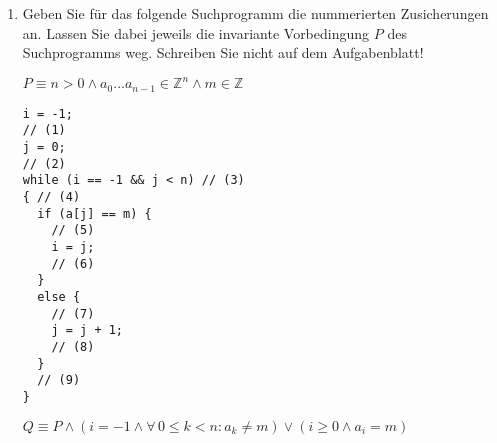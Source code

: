 \documentclass{lehramt-informatik-aufgabe}
\begin{document}
\begin{enumerate}
\begin{liAntwort}
\begin{itemize}
\item Jede Ausführung des Schleifenrumpfs verringert ihren Wert (streng
monoton fallend).

\item Die Schleifenbedingung ist false, wenn $T = 0$.
\end{itemize}

$T$ ist die obere Schranke für die noch ausstehende Anzahl von
Schleifendurchläufen.
\footcite[Seite 33]{sosy:fs:5}

Beweise für Terminierung sind nicht immer möglich!
\footcite[Seite 38]{sosy:fs:5}
\end{liAntwort}


\item Geben Sie für das folgende Suchprogramm die nummerierten
Zusicherungen an. Lassen Sie dabei jeweils die invariante Vorbedingung
$P$ des Suchprogramms weg. Schreiben Sie nicht auf dem Aufgabenblatt!

$P \equiv n > 0 \land a_0 \dots a_{n-1} \in \mathbb{Z}^n \land m \in \mathbb{Z}$
\begin{verbatim}
i = -1;
// (1)
j = 0;
// (2)
while (i == -1 && j < n) // (3)
{ // (4)
  if (a[j] == m) {
    // (5)
    i = j;
    // (6)
  }
  else {
    // (7)
    j = j + 1;
    // (8)
  }
  // (9)
}
\end{verbatim}


$Q \equiv P \land (i = -1 \land \forall \, 0 \leq k < n \colon a_k \neq m) \lor (i \geq 0 \land a_i = m)$

\end{enumerate}
\end{document}
